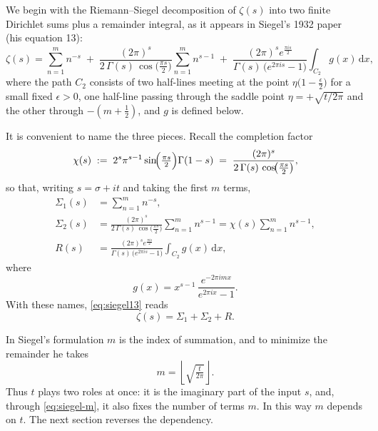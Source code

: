\documentclass[11pt]{article}
\theoremstyle{definition}
\begin{document}
We begin with the Riemann--Siegel decomposition of $\zeta(s)$ into two finite
Dirichlet sums plus a remainder integral, as it appears in Siegel's 1932
paper~\cite{Siegel1932} (his equation 13):
\begin{equation}\label{eq:siegel13}
\zeta(s)
=
\sum_{n=1}^{m} n^{-s}
\;+\;
\frac{(2\pi)^s}{2\,\Gamma(s)\,\cos\!\bigl(\tfrac{\pi s}{2}\bigr)}
\sum_{n=1}^{m} n^{s-1}
\;+\;
\frac{(2\pi)^s e^{\tfrac{\pi i s}{2}}}{\Gamma(s)\,\bigl(e^{2\pi i s}-1\bigr)}
\int_{C_2} g(x)\,\mathrm{d}x,
\end{equation}
where the path $C_2$ consists of two half-lines meeting at the point
$\eta\bigl(1-\tfrac{\epsilon}{2}\bigr)$ for a small fixed $\epsilon>0$, one
half-line passing through the saddle point $\eta=+\sqrt{t/2\pi}$ and the
other through $-(m+\tfrac12)$, and $g$ is defined below.

It is convenient to name the three pieces. Recall the completion factor
\begin{equation}
\chi(s) \;:=\; 2^{s}\pi^{s-1}\sin\!\Bigl(\tfrac{\pi s}{2}\Bigr)\Gamma(1-s)
\;=\;
\frac{(2\pi)^s}{2\,\Gamma(s)\,\cos\!\bigl(\tfrac{\pi s}{2}\bigr)},
\end{equation}
so that, writing $s=\sigma+it$ and taking the first $m$ terms,
\begin{align}
\Sigma_{1}(s) &= \sum_{n=1}^{m} n^{-s}, \\[2pt]
\Sigma_{2}(s) &= \frac{(2\pi)^s}{2\,\Gamma(s)\,\cos\!\bigl(\tfrac{\pi s}{2}\bigr)}
\sum_{n=1}^{m} n^{s-1}
= \chi(s)\sum_{n=1}^{m} n^{s-1}, \\[2pt]
R(s) &= \frac{(2\pi)^s e^{\tfrac{\pi i s}{2}}}{\Gamma(s)\,\bigl(e^{2\pi i s}-1\bigr)}
\int_{C_2} g(x)\,\mathrm{d}x,
\end{align}
where
\begin{equation}
g(x)=x^{s-1}\,\frac{e^{-2\pi i m x}}{e^{2\pi i x}-1}.
\end{equation}
With these names, \eqref{eq:siegel13} reads
\begin{equation}\label{eq:siegel-named}
\zeta(s) = \Sigma_{1} + \Sigma_{2} + R.
\end{equation}

In Siegel's formulation $m$ is the index of summation, and to minimize the
remainder he takes
\begin{equation}\label{eq:siegel-m}
m=\left\lfloor\sqrt{\tfrac{t}{2\pi}}\right\rfloor .
\end{equation}
Thus $t$ plays two roles at once: it is the imaginary part of the input $s$,
and, through \eqref{eq:siegel-m}, it also fixes the number of terms $m$. In
this way $m$ depends on $t$. The next section reverses the dependency.
\end{document}
